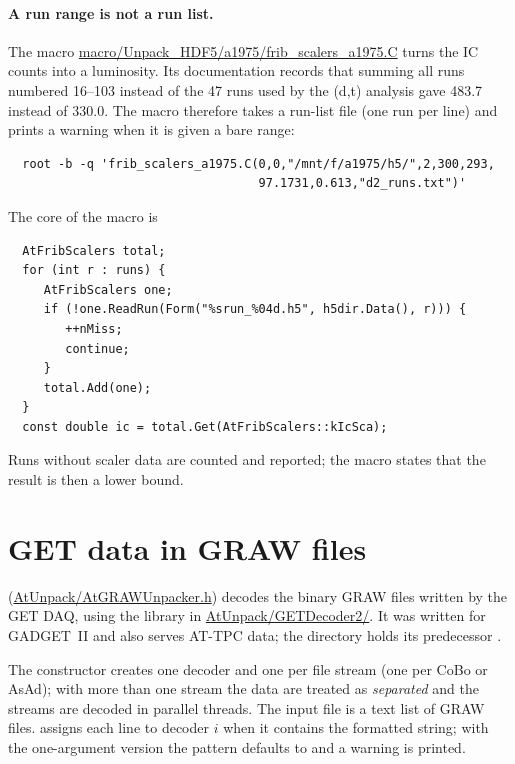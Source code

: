 \paragraph{A run range is not a run list.} The macro
\url{macro/Unpack_HDF5/a1975/frib_scalers_a1975.C} turns the IC counts into a luminosity. Its
documentation records that summing all runs numbered 16--103 instead of the 47 runs used by the
(d,t) analysis gave 483.7 instead of 330.0. The macro therefore takes a run-list file (one run per
line) and prints a warning when it is given a bare range:
\begin{verbatim}
  root -b -q 'frib_scalers_a1975.C(0,0,"/mnt/f/a1975/h5/",2,300,293,
                                   97.1731,0.613,"d2_runs.txt")'
\end{verbatim}
The core of the macro is
\begin{verbatim}
  AtFribScalers total;
  for (int r : runs) {
     AtFribScalers one;
     if (!one.ReadRun(Form("%srun_%04d.h5", h5dir.Data(), r))) {
        ++nMiss;
        continue;
     }
     total.Add(one);
  }
  const double ic = total.Get(AtFribScalers::kIcSca);
\end{verbatim}
Runs without scaler data are counted and reported; the macro states that the result is then a
lower bound.

\section{GET data in GRAW files}
\label{sec:unp-graw}

 (\url{AtUnpack/AtGRAWUnpacker.h}) decodes the binary GRAW files written by the
GET DAQ, using the  library in \url{AtUnpack/GETDecoder2/}. It was written for
GADGET~II and also serves AT-TPC data; the  directory holds its predecessor
.

The constructor  creates one decoder and one
 per file stream (one per CoBo or AsAd); with more than one stream the data are
treated as \emph{separated} and the streams are decoded in parallel threads. The input file is a
text list of GRAW files.  assigns each line to decoder
$i$ when it contains the formatted string; with the one-argument version the pattern defaults to
 and a warning is printed.

